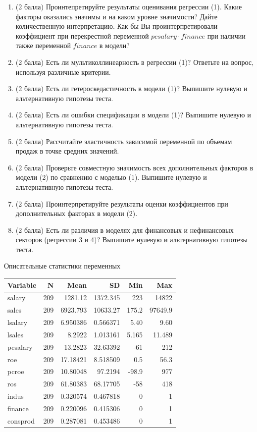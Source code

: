 \begin{enumerate}
    \item (2 балла) Проинтепретируйте результаты оценивания регрессии (1). Какие факторы оказались значимы и на каком уровне значимости? Дайте количественную интерпретацию. Как бы Вы проинтерпретировали коэффициент при перекрестной переменной $pcsalary \cdot finance$ при наличии также переменной $finance$ в модели?
    \item (2 балла) Есть ли мультиколлинеарность в регрессии (1)? Ответьте на вопрос, используя различные критерии.
    \item (2 балла) Есть ли гетероскедастичность в модели (1)? Выпишите нулевую и альтернативную гипотезы теста.
    \item (2 балла) Есть ли ошибки спецификации в модели (1)? Выпишите нулевую и альтернативную гипотезы теста.
    \item (2 балла) Рассчитайте эластичность зависимой переменной по объемам продаж в точке средних значений.
    \item (2 балла) Проверьте совместную значимость всех дополнительных факторов в модели (2) по сравнению с моделью (1). Выпишите нулевую и альтернативную гипотезы теста.
    \item (2 балла) Проинтерпретируйте результаты оценки коэффициентов при дополнительных факторах в модели (2).
    \item (2 балла) Есть ли различия в моделях для финансовых и нефинансовых секторов (регрессии 3 и 4)? Выпишите нулевую и альтернативную гипотезы теста.
\end{enumerate}

Описательные статистики переменных 

\begin{tabular}{lrrrrr}
\toprule
Variable & N & Mean	& SD & Min & Max \\
\midrule
salary & 209 & 1281.12 & 1372.345 & 223 & 14822 \\
sales & 209 & 6923.793 & 10633.27 & 175.2 & 97649.9 \\
lsalary & 209 & 6.950386 & 0.566371 & 5.40 & 9.60 \\
lsales & 209 & 8.2922 & 1.013161 & 5.165 & 11.489 \\
pcsalary & 209 & 13.2823 & 32.63392 & -61 & 212 \\
roe & 209 & 17.18421 & 8.518509 & 0.5 & 56.3 \\
pcroe & 209 & 10.80048 & 97.2194 & -98.9 & 977 \\
ros & 209 & 61.80383 & 68.17705 & -58 & 418 \\
indus & 209 & 0.320574 & 0.467818 & 0 & 1 \\
finance & 209 & 0.220096 & 0.415306 & 0 & 1 \\
consprod & 209 & 0.287081 & 0.453486 & 0 & 1 \\
\bottomrule
\end{tabular}

